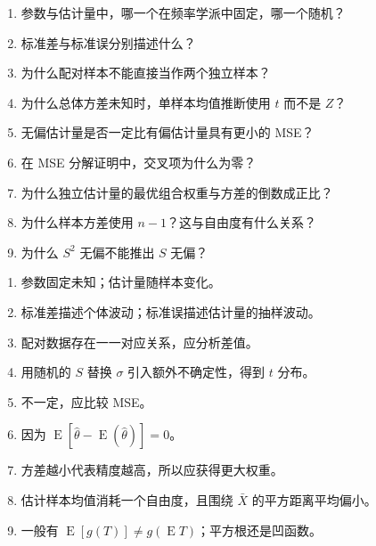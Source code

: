 \documentclass[11pt,a4paper]{article}
\newcommand{\E}{\operatorname{E}}
\begin{document}
\begin{enumerate}
  \item 参数与估计量中，哪一个在频率学派中固定，哪一个随机？
  \item 标准差与标准误分别描述什么？
  \item 为什么配对样本不能直接当作两个独立样本？
  \item 为什么总体方差未知时，单样本均值推断使用 $t$ 而不是 $Z$？
  \item 无偏估计量是否一定比有偏估计量具有更小的 MSE？
  \item 在 MSE 分解证明中，交叉项为什么为零？
  \item 为什么独立估计量的最优组合权重与方差的倒数成正比？
  \item 为什么样本方差使用 $n-1$？这与自由度有什么关系？
  \item 为什么 $S^2$ 无偏不能推出 $S$ 无偏？
\end{enumerate}

\begin{goalbox}[自测答案提示]
\begin{enumerate}
  \item 参数固定未知；估计量随样本变化。
  \item 标准差描述个体波动；标准误描述估计量的抽样波动。
  \item 配对数据存在一一对应关系，应分析差值。
  \item 用随机的 $S$ 替换 $\sigma$ 引入额外不确定性，得到 $t$ 分布。
  \item 不一定，应比较 MSE。
  \item 因为 $\E[\hat\theta-\E(\hat\theta)]=0$。
  \item 方差越小代表精度越高，所以应获得更大权重。
  \item 估计样本均值消耗一个自由度，且围绕 $\bar X$ 的平方距离平均偏小。
  \item 一般有 $\E[g(T)]\ne g(\E T)$；平方根还是凹函数。
\end{enumerate}
\end{goalbox}
\end{document}
